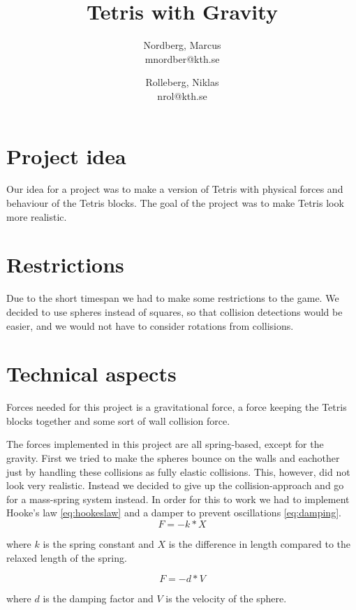\documentclass[11pt]{article} %
\title{Tetris with Gravity}
\author{Nordberg, Marcus \\ mnordber@kth.se
		\and
	Rolleberg, Niklas \\ nrol@kth.se}
\begin{document}
\maketitle

\tableofcontents
\newpage

\section{Project idea}
Our idea for a project was to make a version of Tetris with physical forces and behaviour of the Tetris blocks. The goal of the project was to make Tetris look more realistic. 

\section{Restrictions}
Due to the short timespan we had to make some restrictions to the game. We decided to use spheres instead of squares, so that collision detections would be easier, and we would not have to consider rotations from collisions.

\section{Technical aspects}
Forces needed for this project is a gravitational force, a force keeping the Tetris blocks together and some sort of wall collision force.

The forces implemented in this project are all spring-based, except for the gravity. First we tried to make the spheres bounce on the walls and eachother just by handling these collisions as fully elastic collisions. This, however, did not look very realistic. Instead we decided to give up the collision-approach and go for a mass-spring system instead. In order for this to work we had to implement Hooke's law \eqref{eq:hookeslaw} and a damper to prevent oscillations \eqref{eq:damping}.
\begin{equation}
	\label{eq:hookeslaw}
       F = -k*X
\end{equation}

where $k$ is the spring constant and $X$ is the difference in length compared to the relaxed length of the spring.

\begin{equation}
	\label{eq:damping}
       F = -d*V
\end{equation}

where $d$ is the damping factor and $V$ is the velocity of the sphere.
\end{document}

